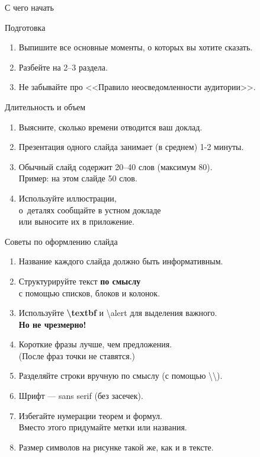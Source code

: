 \documentclass[fullscreen=true,russian,compress,%
	hyperref={unicode,bookmarks=false}]{presentation}
\begin{document}
\begin{frame}{С чего начать}
\begin{block}{Подготовка}
	\begin{enumerate}
		\item Выпишите все основные моменты, о которых вы хотите сказать.
		\item Разбейте на 2--3 раздела.
		\item Не забывайте про <<Правило неосведомленности аудитории>>.
	\end{enumerate}
\end{block}

\begin{block}{Длительность и объем}
	\begin{enumerate}
		\item Выясните, сколько времени отводится ваш доклад.
		\item Презентация одного слайда занимает (в среднем) 1-2 минуты.
		\item Обычный слайд содержит 20--40 слов (максимум 80).\\ 
		Пример: на этом слайде 50 слов.
		\item Используйте иллюстрации, \\
		о~деталях сообщайте в устном докладе \\
		или выносите их в приложение. \ 
		\label{labstr}\hyperlink{example}{}
	\end{enumerate}
\end{block}

\end{frame}

\begin{frame}{Советы по оформлению слайда}
	\begin{enumerate}
		\item Название каждого слайда должно быть информативным.
		\item Структурируйте текст \textbf{по смыслу}\\ 
		с помощью списков, блоков и колонок.    
		\item Используйте \textbf{\textbackslash{}textbf} и \alert{\textbackslash{}alert}
		для выделения важного.\\
		\textbf{Но не чрезмерно!}
		\item Короткие фразы лучше, чем предложения.\\
		(После фраз точки не ставятся.)
		\item Разделяйте строки вручную по смыслу (с помощью \textbackslash\textbackslash).  
		\item Шрифт --- sans serif (без засечек).
		\item Избегайте нумерации теорем и формул.\\
		Вместо этого придумайте метки или названия.
		\item Размер символов на рисунке такой же, как и в тексте.
	\end{enumerate}
\end{frame}
\end{document}
